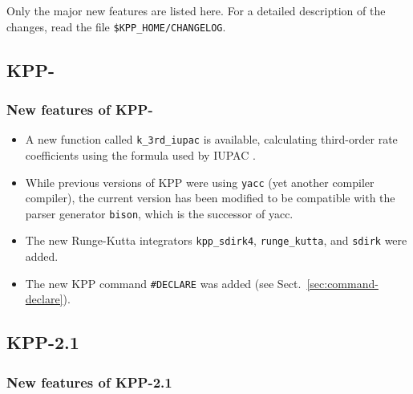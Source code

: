 \documentclass[twoside]{article}
\begin{document}
Only the major new features are listed here. For a detailed description
of the changes, read the file \verb|$KPP_HOME/CHANGELOG|.

\subsection{KPP-\thiskppversion}

\subsubsection{New features of KPP-\thiskppversion}

\begin{itemize}
\item A new function called \verb|k_3rd_iupac| is available, calculating
  third-order rate coefficients using the formula used by IUPAC
  \citep{1610}.
\item While previous versions of KPP were using \verb|yacc| (yet another
  compiler compiler), the current version has been modified to be
  compatible with the parser generator \verb|bison|, which is the
  successor of yacc.
\item The new Runge-Kutta integrators \verb|kpp_sdirk4|,
  \verb|runge_kutta|, and \verb|sdirk| were added.
\item The new KPP command \verb|#DECLARE| was added (see
  Sect.~\ref{sec:command-declare}).
\end{itemize}

\subsection{KPP-2.1}

\subsubsection{New features of KPP-2.1}
\end{document}
